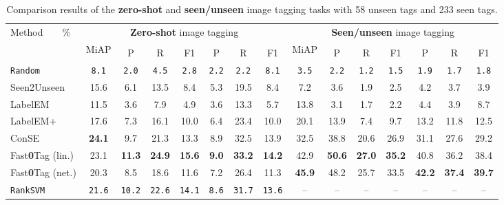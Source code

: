 \documentclass[10pt,twocolumn,letterpaper]{article}
\begin{document}
\begin{table*}
    \centering
\caption{Comparison results of the \textbf{zero-shot} and \textbf{seen/unseen} image tagging tasks with 58 unseen tags and 233 seen tags.}
\label{tZSL}
\footnotesize
\begin{tabular}{|l|c|c|c|c|c|c|c||c|c|c|c|c|c|c|}
\hline
\multirow{3}{*}{ Method~~~~\%} & \multicolumn{7}{c||}{{\bf Zero-shot} image tagging} & \multicolumn{7}{|c|}{\textbf{Seen/unseen} image tagging}\\
\hhline{~--------------} 
& \multirow{2}{*}{ MiAP} & \multicolumn{3}{c|}{} & \multicolumn{3}{|c||}{} & \multirow{2}{*}{ MiAP} & \multicolumn{3}{c|}{} & \multicolumn{3}{|c|}{}\\
    & & P & R  & { F1} & P & R & { F1} &  & P & R  & { F1} & P & R & { F1} \\
    
\hline\hline
{\tt Random} & {\tt 8.1}  & {\tt 2.0} & {\tt 4.5} & {\tt 2.8}  & {\tt 2.2} & {\tt 2.2} & {\tt 8.1} & {\tt 3.5}& {\tt 2.2} & {\tt 1.2} & {\tt 1.5} & {\tt 1.9} & {\tt 1.7} & {\tt 1.8}  \\
\hline
Seen2Unseen & 15.6  & 6.1 & 13.5 & 8.4  & 5.3 & 19.5 & 8.4 & 7.2  & 3.6 & 1.9 & 2.5 & 4.2 & 3.7 & 3.9 \\
\hline
 LabelEM~\cite{akata_evaluation_2015} & 11.5 & 3.6 & 7.9 & 4.9  & 3.6 & 13.3 & 5.7 & 13.8 & 3.1 & 1.7 & 2.2  & 4.4 & 3.9 & 8.7 \\
\hline
 LabelEM+~\cite{akata_evaluation_2015} & 17.6 & 7.3 & 16.1 & 10.0 & 6.4 & 23.4 & 10.0 & 20.1  & 13.9 & 7.4 & 9.7  & 13.2 & 11.8 & 12.5 \\
\hline
 ConSE~\cite{norouzi_zero-shot_2013} & {\bf24.1}  & 9.7 & 21.3 & 13.3  & 8.9 & 32.5 & 13.9 & 32.5  & 38.8 & 20.6 & 26.9 & 31.1 & 27.6 & 29.2 \\
\hline

{ Fast\textbf{0}Tag (lin.)}& 23.1  & {\bf11.3} & {\bf24.9} & {\bf15.6 } & {\bf9.0} & {\bf33.2} & {\bf14.2} & 42.9  & {\bf50.6} & {\bf27.0} & {\bf35.2}  & 40.8 & 36.2 & 38.4 \\
\hline
{ Fast\textbf{0}Tag (net.)} & 20.3  &  8.5 &  18.6 &  11.6  &  7.2 &  26.4 & 11.3 &  {\bf45.9} &  48.2 &  25.7 &  33.5  & {\bf42.2} & {\bf37.4} & {\bf39.7}\\
\hline
{\tt RankSVM } & {\tt 21.6}  & {\tt 10.2} & {\tt 22.6} & {\tt 14.1}  & {\tt 8.6} & {\tt 31.7} & {\tt 13.6} & --& -- & -- & -- & -- & -- & -- \\
\hline
\end{tabular}
\end{table*}
\end{document}
